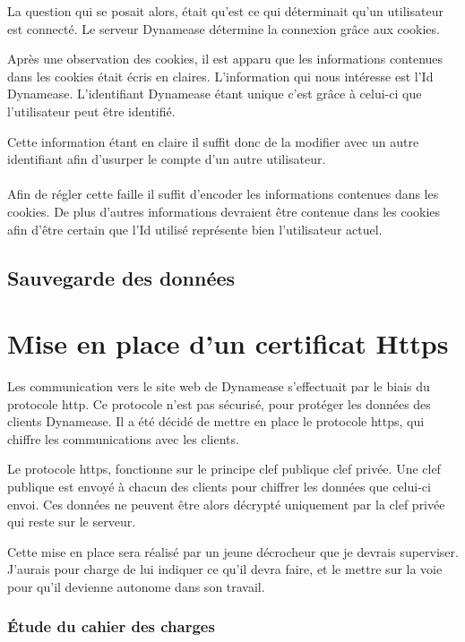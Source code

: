 La question qui se posait alors, était qu'est ce qui déterminait qu'un utilisateur est connecté. Le serveur Dynamease détermine la connexion grâce aux cookies.

Après une observation des cookies, il est apparu que les informations contenues dans les cookies était écris en claires. L'information qui nous intéresse est l'Id Dynamease. L'identifiant Dynamease étant unique c'est grâce à celui-ci que l'utilisateur peut être identifié.

Cette information étant en claire il suffit donc de la modifier avec un autre identifiant afin d'usurper le compte d'un autre utilisateur.
\\\\

Afin de régler cette faille il suffit d'encoder les informations contenues dans les cookies. De plus d'autres informations devraient être contenue dans les cookies afin d'être certain que l'Id utilisé représente bien l'utilisateur actuel. 

\subsection{Sauvegarde des données}

\section{Mise en place d'un certificat Https}

Les communication vers le site web de Dynamease s'effectuait par le biais du protocole http. Ce protocole n'est pas sécurisé, pour protéger les données des clients Dynamease. Il a été décidé de mettre en place le protocole https, qui chiffre les communications avec les clients.

Le protocole https, fonctionne sur le principe clef publique clef privée. Une clef publique est envoyé à chacun des clients pour chiffrer les données que celui-ci envoi. Ces données ne peuvent être alors décrypté uniquement par la clef privée qui reste sur le serveur.

Cette mise en place sera réalisé par un jeune décrocheur que je devrais superviser. J'aurais pour charge de lui indiquer ce qu'il devra faire, et le mettre sur la voie pour qu'il devienne autonome dans son travail.

\subsubsection{Étude du cahier des charges}

